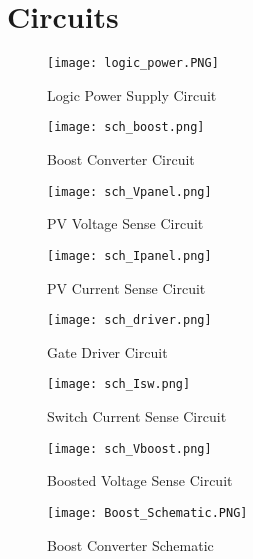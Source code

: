 
\chapter{Circuits} %

\label{AppendixB} %


\begin{figure}[h]
\centering
\texttt{[image: logic\_power.PNG]}
\caption{Logic Power Supply Circuit}
\label{logic power fig}
\end{figure}


\begin{figure}[h]
\centering
\texttt{[image: sch\_boost.png]}
\caption{Boost Converter Circuit}
\label{boostConverterCircuit}
\end{figure}

\begin{figure}[h]
\centering
\texttt{[image: sch\_Vpanel.png]}
\caption{PV Voltage Sense Circuit}
\label{VpvSenseCircuit}
\end{figure}

\begin{figure}[h]
\centering
\texttt{[image: sch\_Ipanel.png]}
\caption{PV Current Sense Circuit}
\label{IpvSenseCircuit}
\end{figure}

\begin{figure}[h]
\centering
\texttt{[image: sch\_driver.png]}
\caption{ Gate Driver Circuit}
\label{gateDriverCircuit}
\end{figure}

\begin{figure}[h]
\centering
\texttt{[image: sch\_Isw.png]}
\caption{Switch Current Sense Circuit}
\label{IswSenseCircuit}
\end{figure}

\begin{figure}[h]
\centering
\texttt{[image: sch\_Vboost.png]}
\caption{Boosted Voltage Sense Circuit}
\label{VboostSenseCircuit}
\end{figure}

\begin{figure}[h]
\centering
\texttt{[image: Boost\_Schematic.PNG]}
\caption{Boost Converter Schematic}
\label{boostCompleteSchematic}
\end{figure}

